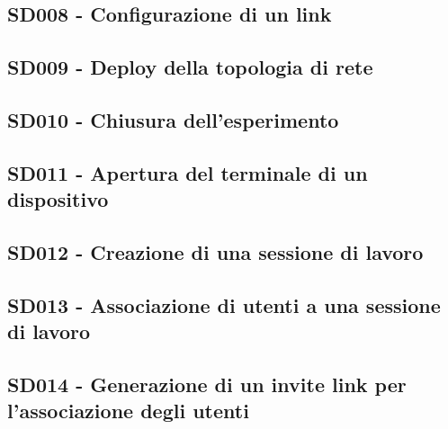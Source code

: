 \documentclass[../main.tex]{subfiles}
\begin{document}
\subsection{SD008 - Configurazione di un link }
\figure[H]
\centering

\endfigure
\clearpage

\subsection{SD009 - Deploy della topologia di rete }
\figure[H]
\centering

\endfigure
\clearpage


\subsection{SD010 - Chiusura dell'esperimento }
\figure[H]
\centering

\endfigure
\clearpage

\subsection{SD011 - Apertura del terminale di un dispositivo }
\figure[H]
\centering

\endfigure
\clearpage

\subsection{SD012 - Creazione di una sessione di lavoro }
\figure[H]
\centering

\endfigure
\clearpage

\subsection{SD013 - Associazione di utenti a una sessione di lavoro }
\figure[H]
\centering

\endfigure
\clearpage

\subsection{SD014 - Generazione di un invite link per l'associazione degli utenti }
\figure[H]
\centering

\endfigure
\clearpage
\end{document}
